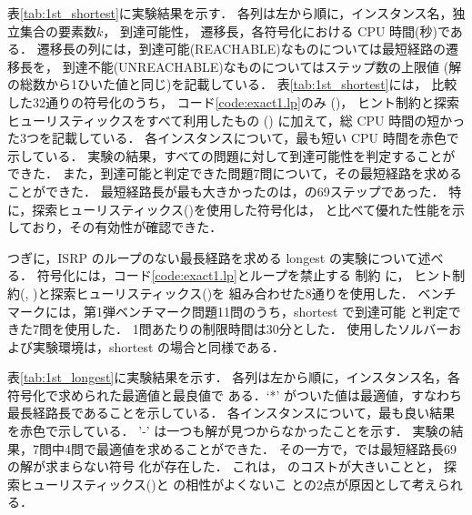 表\ref{tab:1st_shortest}に実験結果を示す．
各列は左から順に，インスタンス名，独立集合の要素数$k$，
到達可能性，
遷移長，各符号化における CPU 時間(秒)である．
遷移長の列には，到達可能(REACHABLE)なものについては最短経路の遷移長を，
到達不能(UNREACHABLE)なものについてはステップ数の上限値
(解の総数から1ひいた値と同じ)を記載している．
表\ref{tab:1st_shortest}には，
比較した32通りの符号化のうち，
コード\ref{code:exact1.lp}のみ ()，
ヒント制約と探索ヒューリスティックスをすべて利用したもの ()
に加えて，総 CPU 時間の短かった3つを記載している．
各インスタンスについて，最も短い CPU 時間を赤色で示している．
%
実験の結果，すべての問題に対して到達可能性を判定することができた．
また，到達可能と判定できた問題7問について，その最短経路を求めることができた．
最短経路長が最も大きかったのは，の69ステップであった．
特に，探索ヒューリスティックス()を使用した符号化は，
 と比べて優れた性能を示しており，その有効性が確認できた．

つぎに，ISRP のループのない最長経路を求める longest の実験について述べる．
符号化には，コード\ref{code:exact1.lp}とループを禁止する
制約  に，
ヒント制約(, )と探索ヒューリスティックス()を
組み合わせた8通りを使用した．
ベンチマークには，第1弾ベンチマーク問題11問のうち，shortest で到達可能
と判定できた7問を使用した．
1問あたりの制限時間は30分とした．
使用したソルバーおよび実験環境は，shortest の場合と同様である．

表\ref{tab:1st_longest}に実験結果を示す．
各列は左から順に，インスタンス名，各符号化で求められた最適値と最良値で
ある．`*' がついた値は最適値，すなわち最長経路長であることを示している．
各インスタンスについて，最も良い結果を赤色で示している．
'-' は一つも解が見つからなかったことを示す．
%
実験の結果，7問中4問で最適値を求めることができた．
その一方で，では最短経路長69の解が求まらない符号
化が存在した．
これは， のコストが大きいことと，
探索ヒューリスティックス()と  の相性がよくないこ
との2点が原因として考えられる．

